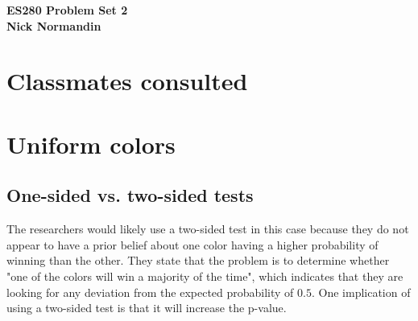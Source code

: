 \documentclass{article}
\begin{document}
\noindent
\textbf{ES280 Problem Set 2} \\
\textbf{Nick Normandin} \\
\section*{Classmates consulted}

\section{Uniform colors}%
\label{sec:Uniform colors}

\subsection{One-sided vs. two-sided tests}%
The researchers would likely use a two-sided test in this case because they do not appear to have a prior belief about one color having a higher probability of winning than the other. They state that the problem is to determine whether "one of the colors will win a majority of the time", which indicates that they are looking for any deviation from the expected probability of $0.5$. One implication of using a two-sided test is that it will increase the p-value.
\label{sub:One-sided vs. two-sided tests}
\end{document}
